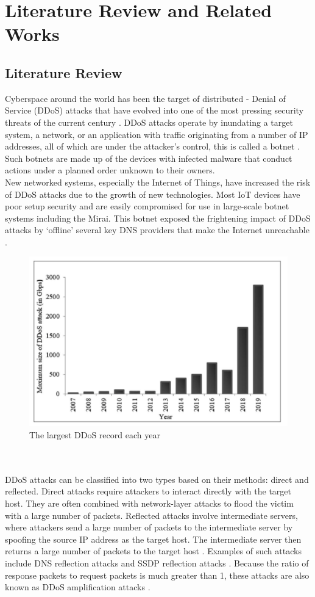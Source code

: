 \chapter{Literature Review and Related Works}
\section{Literature Review}
Cyberspace around the world has been the target of distributed - Denial of Service (DDoS) attacks that have evolved into one of the most pressing security threats of the current century \cite{devi2018cyberspace}. DDoS attacks operate by inundating a target system, a network, or an application with traffic originating from a number of IP addresses, all of which are under the attacker’s control, this is called a botnet \cite{poonia2024comprehensive}. Such botnets are made up of the devices with infected malware that conduct actions under a planned order unknown to their owners.
\\
New networked systems, especially the Internet of Things, have increased the risk of DDoS attacks due to the growth of new technologies. Most IoT devices have poor setup security and are easily compromised for use in large-scale botnet systems including the Mirai. This botnet exposed the frightening impact of DDoS attacks by ‘offline’ several key DNS providers that make the Internet unreachable \cite{joodat2017distributed}.
\\
\begin{figure}[h]
    \centering
    \includegraphics[width=0.8\linewidth]{thesis/DDoSGraph.png}
    \caption{The largest DDoS record each year}
    \label{fig:enter-label}
\end{figure}
\\
\\
DDoS attacks can be classified into two types based on their methods: direct and reflected. Direct attacks require attackers to interact directly with the target host. They are often combined with network-layer attacks to flood the victim with a large number of packets. Reflected attacks involve intermediate servers, where attackers send a large number of packets to the intermediate server by spoofing the source IP address as the target host. The intermediate server then returns a large number of packets to the target host \cite{gai2024introduction}. Examples of such attacks include DNS reflection attacks and SSDP reflection attacks \cite{arukonda2015innocent}. Because the ratio of response packets to request packets is much greater than 1, these attacks are also known as DDoS amplification attacks \cite{sieklik2016evaluation}. 
